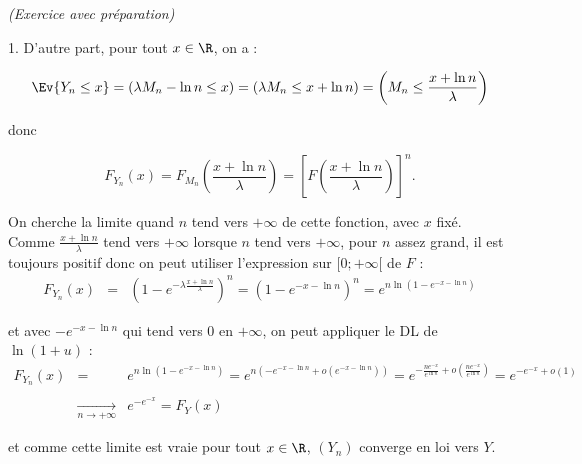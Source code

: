 \documentclass[11pt]{article}%
\begin{document}
\begin{exercice}{\it (Exercice avec préparation)}
\begin{noliste}{1.}
 D'autre part, pour tout $x \in \R$, on a : 
 
\[
 \Ev{ Y_{n} \leq x } = ( \lambda M_{n} - \ln n \leq x ) = ( \lambda
M_{n} \leq x + \ln n ) = \left( M_{n} \leq \frac{ x + \ln n }{ \lambda
} \right) 
\]

 donc
 
\[
 F_{ Y_{n} } (x) = F_{ M_{n} } \left( \frac{ x + \ln n }{ \lambda }
\right) = \left[ F \left( \frac{ x + \ln n }{ \lambda } \right)
\right]^{n}. 
\]

 On cherche la limite quand $n$ tend vers $ + \infty$ de cette
fonction, avec $x$ fixé. \\

 Comme $ \frac{ x + \ln n }{ \lambda }$ tend vers $ + \infty$ lorsque
$n$ tend vers $ + \infty$, pour $n$ assez grand, il est toujours
positif donc on peut utiliser l'expression sur $[0 ; + \infty[$ de $F$
: 
 \begin{eqnarray*}
 F_{ Y_{n} } (x) & = & \left( 1 - e^{ - \lambda \frac{ x + \ln n }{
\lambda } } \right)^{n} = \left( 1 - e^{ - x - \ln n } \right)^{n} =
e^{ n \ln \left( 1 - e^{ - x - \ln n } \right) } \end{eqnarray*}

 et avec $- e^{ - x - \ln n }$ qui tend vers 0 en $ + \infty$, on peut
appliquer le DL de $\ln (1 + u)$ : 
 \begin{eqnarray*}
 F_{ Y_{n} } (x) & = & e^{ n \ln \left( 1 - e^{ - x - \ln n } \right) }
= e^{ n \left( - e^{ - x - \ln n } + o ( e^{ - x - \ln n } ) \right) }
= e^{ - \frac{ n e^{ - x } }{ e^{ \ln n } } + o \left( \frac{ n e^{ - x
} }{ e^{ \ln n } } \right) } = e^{ - e^{ - x } + o ( 1 ) } \\
\\
 & \xrightarrow[ n \rightarrow + \infty ]{} & e^{ - e^{ - x } } = F_{Y}
(x) \end{eqnarray*}

 et comme cette limite est vraie pour tout $x \in \R$, $(Y_{n})$
converge en loi vers $Y$.

 \end{noliste}
 \end{exercice}

 \newpage
\end{document}
